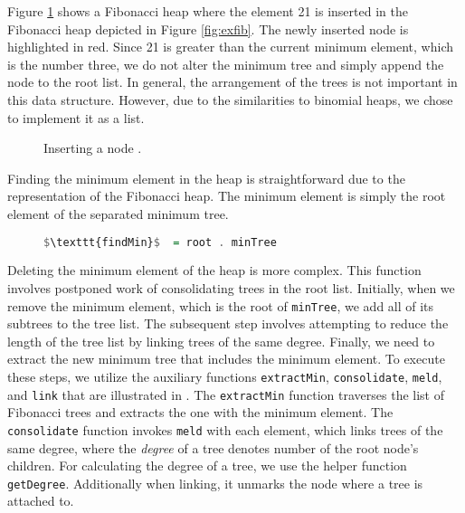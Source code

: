 \documentclass{clmthesis}
\begin{document}
Figure \ref{fig:Finsert} shows a Fibonacci heap where the element 21 is inserted in the Fibonacci heap depicted in Figure \ref{fig:exfib}. The newly inserted node is highlighted in red. Since 21 is greater than the current minimum element, which is the number three, we do not alter the minimum tree and simply append the node to the root list. In general, the arrangement of the trees is not important in this data structure. However, due to the similarities to binomial heaps, we chose to implement it as a list.

\begin{figure}[h]
	\centering
	\caption{Inserting a node \cite{thomas2022}.}
	\label{fig:Finsert}
\end{figure}
\FloatBarrier
Finding the minimum element in the heap is straightforward due to the representation of the Fibonacci heap. The minimum element is simply the root element of the separated minimum tree.

\begin{figure}[h]
\begin{lstlisting}[mathescape=true, language=haskell, caption={Finding the minimum element.},captionpos=b]
$\texttt{findMin}$  = root . minTree
\end{lstlisting}
\end{figure}

Deleting the minimum element of the heap is more complex. This function involves postponed work of consolidating trees in the root list. Initially, when we remove the minimum element, which is the root of \lstinline{minTree}, we add all of its subtrees to the tree list. The subsequent step involves attempting to reduce the length of the tree list by linking trees of the same degree. Finally, we need to extract the new minimum tree that includes the minimum element. To execute these steps, we utilize the auxiliary functions \texttt{extractMin}, \texttt{consolidate}, \texttt{meld}, and \texttt{link} that are illustrated in . The \texttt{extractMin} function traverses the list of Fibonacci trees and extracts the one with the minimum element. The \texttt{consolidate} function invokes \texttt{meld} with each element, which links trees of the same degree, where the \emph{degree} of a tree denotes number of the root node's children. For calculating the degree of a tree, we use the helper function \texttt{getDegree}. Additionally when linking, it unmarks the node where a tree is attached to.
\end{document}

